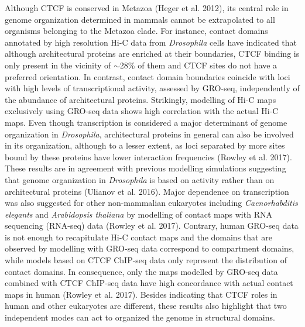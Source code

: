 Although CTCF is conserved in Metazoa (Heger et al. 2012), its central role in genome organization determined in mammals cannot be extrapolated to all organisms belonging to the Metazoa clade. For instance, contact domains annotated by high resolution Hi-C data from \textit{Drosophila} cells have indicated that although architectural proteins are enriched at their boundaries, CTCF binding is only present in the vicinity of $\sim$28\% of them and CTCF sites do not have a preferred orientation. In contrast, contact domain boundaries coincide with loci with high levels of transcriptional activity, assessed by GRO-seq, independently of the abundance of architectural proteins. Strikingly, modelling of Hi-C maps exclusively using GRO-seq data shows high correlation with the actual Hi-C maps. Even though transcription is considered a major determinant of genome organization in \textit{Drosophila}, architectural proteins in general can also be involved in its organization, although to a lesser extent, as loci separated by more sites bound by these proteins have lower interaction frequencies (Rowley et al. 2017). These results are in agreement with previous modelling simulations suggesting that genome organization in \textit{Drosophila} is based on activity rather than on architectural proteins (Ulianov et al. 2016). Major dependence on transcription was also suggested for other non-mammalian eukaryotes including \textit{Caenorhabditis elegants} and \textit{Arabidopsis thaliana} by modelling of contact maps with RNA sequencing (RNA-seq) data (Rowley et al. 2017). Contrary, human GRO-seq data is not enough to recapitulate Hi-C contact maps and the domains that are observed by modelling with GRO-seq data correspond to compartment domains, while models based on CTCF ChIP-seq data only represent the distribution of contact domains. In consequence, only the maps modelled by GRO-seq data combined with CTCF ChIP-seq data have high concordance with actual contact maps in human (Rowley et al. 2017). Besides indicating that CTCF roles in human and other eukaryotes are different, these results also highlight that two independent modes can act to organized the genome in structural domains.\\

